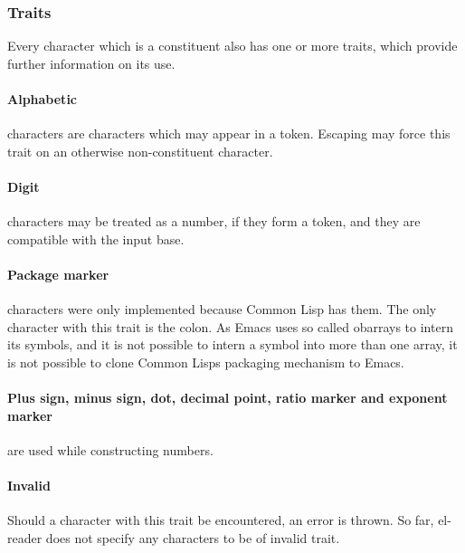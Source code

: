 \documentclass[a4paper]{article}
\newcommand{\cl}{Common Lisp}
\newcommand{\elr}{el-reader}
\begin{document}
\subsubsection{Traits}
\label{subsubsec:traits}

Every character which is a constituent also has one or more traits, which
provide further information on its use.

\paragraph{Alphabetic}
\label{par:alphabetic}

characters are characters which may appear in a token.  Escaping may force this
trait on an otherwise non-constituent character.

\paragraph{Digit}
\label{par:digit}

characters may be treated as a number, if they form a token, and they are
compatible with the input base.

\paragraph{Package marker}
\label{par:package-marker}

characters were only implemented because \cl{} has them.  The only character
with this trait is the colon.  As Emacs uses so called obarrays to intern its
symbols, and it is not possible to intern a symbol into more than one
array\cite{no-multi-intern}, it is not possible to clone \cl{}s packaging
mechanism to Emacs.

\paragraph{Plus sign, minus sign, dot, decimal point, ratio marker and exponent marker}
\label{par:number-traits}

are used while constructing numbers.

\paragraph{Invalid}
\label{par:invalid}

Should a character with this trait be encountered, an error is thrown.  So far,
\elr{} does not specify any characters to be of invalid trait.
\end{document}
